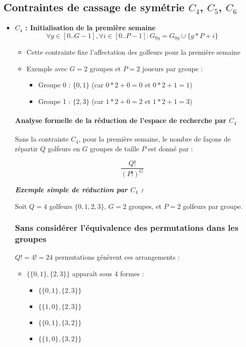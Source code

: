 \documentclass{article}
\begin{document}
\subsection*{Contraintes de cassage de symétrie $C_4$, $C_5$, $C_6$}
\begin{itemize}[label=\textbullet]
\item \textbf{$C_4$ : Initialisation de la première semaine}
\[ \forall g \in [0..G-1], \forall i \in [0..P-1] : G_{0g} = G_{0g} \cup \{g*P + i\} \]
\begin{itemize}[label=\textendash]
\item Cette contrainte fixe l'affectation des golfeurs pour la première semaine
\item Exemple avec $G=2$ groupes et $P=2$ joueurs par groupe :
  \begin{itemize}
    \item Groupe 0 : $\{0, 1\}$ (car $0*2 + 0 = 0$ et $0*2 + 1 = 1$)
    \item Groupe 1 : $\{2, 3\}$ (car $1*2 + 0 = 2$ et $1*2 + 1 = 3$)
  \end{itemize}
\end{itemize}
\paragraph{Analyse formelle de la réduction de l'espace de recherche par $C_4$}

Sans la contrainte $C_4$, pour la première semaine, le nombre de façons de répartir $Q$ golfeurs en $G$ groupes de taille $P$ est donné par :

\[ \frac{Q!}{(P!)^G} \]

\textbf{\textit{Exemple simple de réduction par $C_4$ :}}

Soit $Q=4$ golfeurs $\{0,1,2,3\}$, $G=2$ groupes, et $P=2$ golfeurs par groupe.

\subsubsection*{Sans considérer l'équivalence des permutations dans les groupes}
$Q! = 4! = 24$ permutations génèrent ces arrangements :
\begin{itemize}[label=\textendash]
\item $\{\{0,1\},\{2,3\}\}$ apparaît sous 4 formes :
  \begin{itemize}
    \item $\{\{0,1\},\{2,3\}\}$
    \item $\{\{1,0\},\{2,3\}\}$
    \item $\{\{0,1\},\{3,2\}\}$
    \item $\{\{1,0\},\{3,2\}\}$
  \end{itemize}
\end{itemize}


\end{itemize}
\end{document}
